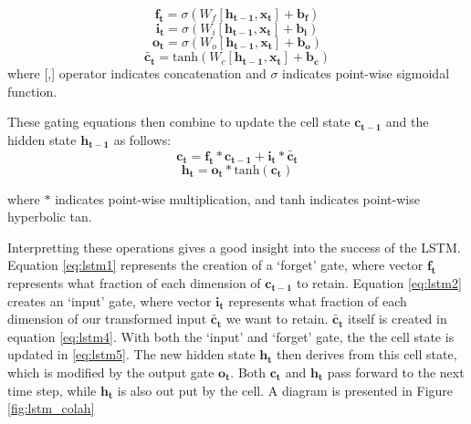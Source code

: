 \begin{equation}
    \mathbf{f_t} = \sigma(W_f [\mathbf{h_{t-1}}, \mathbf{x_t}] + \mathbf{b_f})
    \label{eq:lstm1}
\end{equation}
\begin{equation}
    \mathbf{i_t} = \sigma(W_i [\mathbf{h_{t-1}}, \mathbf{x_t}] + \mathbf{b_i})
    \label{eq:lstm2}
\end{equation}
\begin{equation}
    \mathbf{o_t} = \sigma(W_o [\mathbf{h_{t-1}}, \mathbf{x_t}] + \mathbf{b_o})
    \label{eq:lstm3}
\end{equation}
\begin{equation}
    \mathbf{\tilde{c_t}} = \text{tanh}(W_c [\mathbf{h_{t-1}}, \mathbf{x_t}] + \mathbf{b_c})
    \label{eq:lstm4}
\end{equation}
where [,] operator indicates concatenation and $\sigma$ indicates point-wise sigmoidal function.

These gating equations then combine to update the cell state $\mathbf{c_{t-1}}$ and the hidden state $\mathbf{h_{t-1}}$ as follows: 
\begin{equation}
    \mathbf{c_t} = \mathbf{f_t} * \mathbf{c_{t-1}} + \mathbf{i_t} * \mathbf{\tilde{c_t}}
    \label{eq:lstm5}
\end{equation}
\begin{equation}
    \mathbf{h_t} = \mathbf{o_t} * \text{tanh}(\mathbf{c_t})
    \label{eq:lstm6}
\end{equation}

where  $*$ indicates point-wise multiplication, and tanh indicates point-wise hyperbolic tan.

Interpretting these operations gives a good insight into the success of the LSTM.  
Equation \ref{eq:lstm1} represents the creation of a `forget' gate, where vector $\mathbf{f_t}$ represents what fraction of each dimension of $\mathbf{c_{t-1}}$ to retain. 
Equation \ref{eq:lstm2}  creates an `input' gate, where vector $\mathbf{i_t}$ represents what fraction of each dimension of our transformed input $\mathbf{\tilde{c_{t}}}$ we want to retain.  
$\mathbf{\tilde{c_{t}}}$ itself is created in equation \ref{eq:lstm4}. With both the `input' and `forget' gate, the  the cell state is updated in \ref{eq:lstm5}. 
The new hidden state $\mathbf{h_{t}}$ then derives from this cell state, which is modified by the output gate $\mathbf{o_t}$. 
Both $\mathbf{c_{t}}$ and $\mathbf{h_{t}}$ pass forward to the next time step, while $\mathbf{h_{t}}$ is also out put by the cell. 
A diagram is presented in Figure \ref{fig:lstm_colah}

